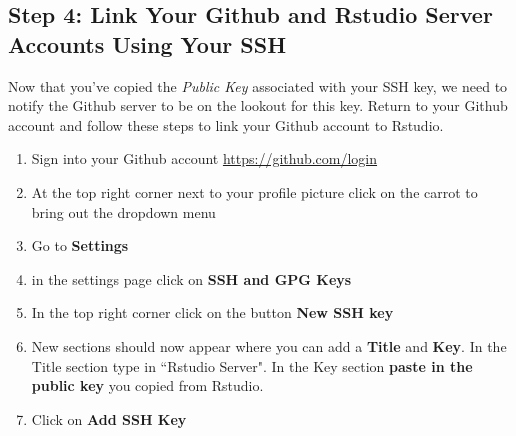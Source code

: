 \documentclass{article}\usepackage[]{graphicx}\usepackage[]{color}
\begin{document}
  \subsection*{Step 4: Link Your Github and Rstudio Server Accounts Using Your SSH} 
  Now that you've copied the \emph{Public Key} associated with your SSH key, we need to notify the Github server to be on the lookout for this key. Return to your Github account and follow these steps to link your Github account to Rstudio. 
  \begin{enumerate}
  \item Sign into your Github account \url{https://github.com/login}
  \item At the top right corner next to your profile picture click on the carrot to bring out the dropdown menu
  \item Go to \textbf{Settings}
  \item in the settings page click on \textbf{SSH and GPG Keys}
  \item In the top right corner click on the button \textbf{New SSH key}
  \item New sections should now appear where you can add a \textbf{Title} and \textbf{Key}. In the Title section type in ``Rstudio Server". In the Key section \textbf{paste in the public key} you copied from Rstudio.
  \item Click on \textbf{Add SSH Key}
  \end{enumerate}
 
\end{document}
